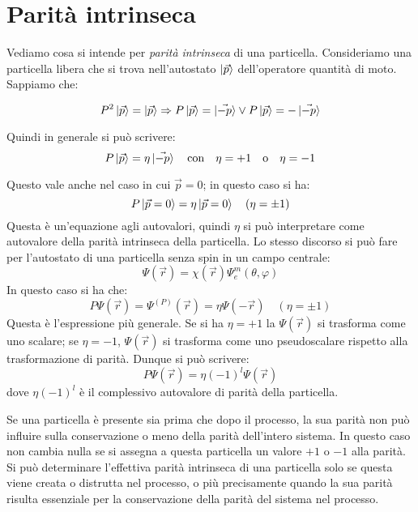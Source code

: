 \section{Parità intrinseca}
Vediamo cosa si intende per \emph{parità intrinseca} di una particella. Consideriamo una particella libera
che si trova nell'autostato $\ket{\vec{p}}$ dell'operatore quantità di moto. Sappiamo che:

\begin{equation}
 P^2 \ket{\vec{p}} = \ket{\vec{p}} \Rightarrow P\ket{\vec{p}} = \ket{\vec{-p}} \vee P\ket{\vec{p}} = -\ket{\vec{-p}}
\end{equation}

Quindi in generale si può scrivere:
\begin{equation}
 P\ket{\vec{p}} = \eta\ket{\vec{-p}} \quad\text{con} \quad\eta = +1 \quad\text{o} \quad\eta = -1
\end{equation}

Questo vale anche nel caso in cui $\vec{p} = 0$; in questo caso si ha:
\begin{equation}
 P\ket{\vec{p} = 0} = \eta\ket{\vec{p} = 0} \quad (\eta = \pm1)
\end{equation}
Questa è un'equazione agli autovalori, quindi $\eta$ si può interpretare come autovalore della parità intrinseca della
particella. Lo stesso discorso si può fare per l'autostato di una particella senza spin in un campo centrale:
\begin{equation}
 \Psi(\vec{r}) = \chi(\vec{r}) \Psi_e^m(\theta, \varphi)
\end{equation}
In questo caso si ha che:
\begin{equation}
 P\Psi(\vec{r}) = \Psi^{(P)}(\vec{r}) = \eta \Psi(-\vec{r}) \quad (\eta = \pm1)
\end{equation}
Questa è l'espressione più generale. Se si ha $\eta = +1$ la $\Psi(\vec{r})$ si trasforma
come uno scalare; se $\eta = -1$, $\Psi(\vec{r})$ si trasforma come uno pseudoscalare rispetto alla trasformazione di parità.
Dunque si può scrivere:
\begin{equation}
 P\Psi(\vec{r}) = \eta(-1)^l \Psi(\vec{r})
\end{equation}
dove $\eta(-1)^l$ è il complessivo autovalore di parità della particella.

Se una particella è presente sia prima che dopo il processo, la sua parità non può influire sulla conservazione o meno della
parità dell'intero sistema. In questo caso non cambia nulla se si assegna a questa particella un valore $+1$ o $-1$ alla parità.
Si può determinare l'effettiva parità intrinseca di una particella solo se questa viene creata o distrutta nel processo, o più
precisamente quando la sua parità risulta essenziale per la conservazione della parità del sistema nel processo.

